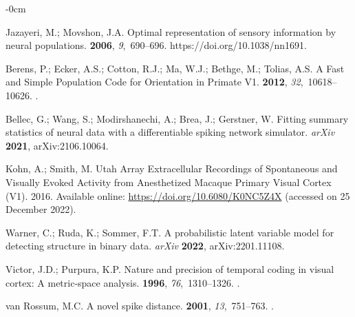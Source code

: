 \documentclass[brainsci, %
               review,accept,pdftex,moreauthors
               ]{Definitions/mdpi}
\begin{document}
\begin{adjustwidth}{-\extralength}{0cm}
\begin{thebibliography}{999}
Jazayeri, M.; Movshon, J.A.
\newblock Optimal representation of sensory information by neural populations.
 {\bf 2006}, {\em 9},~690--696.
  {{https://doi.org/10.1038/nn1691}}.

Berens, P.; Ecker, A.S.; Cotton, R.J.; Ma, W.J.; Bethge, M.; Tolias, A.S.
\newblock A {Fast} and {Simple} {Population} {Code} for {Orientation} in
  {Primate} {V1}.
 {\bf 2012}, {\em 32},~10618--10626.
.

Bellec, G.; Wang, S.; Modirshanechi, A.; Brea, J.; Gerstner, W.
\newblock Fitting summary statistics of neural data with a differentiable
  spiking network simulator. \emph{arXiv} \textbf{2021},  	arXiv:2106.10064.

Kohn, A.; Smith, M.
\newblock Utah Array Extracellular Recordings of Spontaneous and Visually
  Evoked Activity from Anesthetized Macaque Primary Visual Cortex ({V1}). 
  2016.   
Available online: {\url{https://doi.org/10.6080/K0NC5Z4X}}  {(accessed on 25 December 2022).} %


Warner, C.; Ruda, K.; Sommer, F.T.
\newblock A probabilistic latent variable model for detecting structure in
  binary data. \emph{arXiv} \textbf{2022}, arXiv:2201.11108.

Victor, J.D.; Purpura, K.P.
\newblock Nature and precision of temporal coding in visual cortex: A
  metric-space analysis.
 {\bf 1996}, {\em 76},~1310--1326.
.

van Rossum, M.C.
\newblock A novel spike distance.
 {\bf 2001}, {\em 13},~751--763.
.


\end{thebibliography}
\end{adjustwidth}
\end{document}
